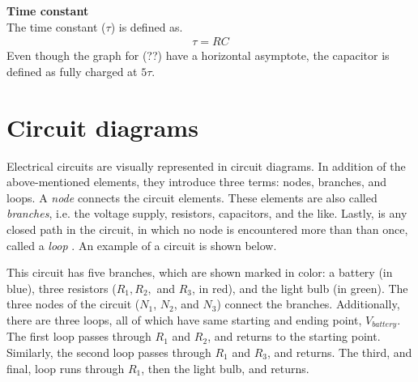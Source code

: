 \textbf{Time constant}
\\
The time constant ($\tau$) is defined as.
\begin{align}
\tau = RC
\end{align}
Even though the graph for (??) have a horizontal asymptote, the capacitor is defined as fully charged at $5\tau$.

\section{Circuit diagrams}
Electrical circuits are visually represented in circuit diagrams. In addition of the above-mentioned elements, they introduce three terms: nodes, branches, and loops. A \textit{node} connects the circuit elements. These elements are also called \textit{branches}, i.e.  the voltage supply, resistors, capacitors, and the like. Lastly, is any closed path in the circuit, in which no node is encountered more than than once, called a \textit{loop} \cite[page~32]{bcircuit}. An example of a circuit is shown below.

\begin{figure}[H]
 
\end{figure}

This circuit has five branches, which are shown marked in color: a battery (in blue), three resistors ($R_1, R_2,$ and $R_3$, in red), and the light bulb (in green). The three nodes of the circuit ($N_1$, $N_2$, and $N_3$) connect the branches. Additionally, there are three loops, all of which have same starting and ending point, $V_{battery}$. The first loop passes through $R_1$ and $R_2$, and returns to the starting point. Similarly, the second loop passes through $R_1$ and $R_3$, and returns. The third, and final, loop runs through $R_1$, then the light bulb, and returns. 

